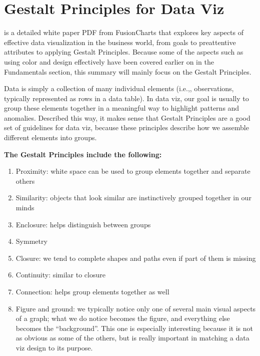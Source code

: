 \documentclass[]{book}
\providecommand{\tightlist}{%
  \setlength{\itemsep}{0pt}\setlength{\parskip}{0pt}}
\theoremstyle{definition}
\theoremstyle{definition}
\theoremstyle{definition}
\theoremstyle{remark}
\begin{document}
\section{Gestalt Principles for Data
Viz}\label{gestalt-principles-for-data-viz}

\citep{principles-fusioncharts} is a detailed white paper PDF from
FusionCharts that explores key aspects of effective data visualization
in the business world, from goals to preattentive attributes to applying
Gestalt Principles. Because some of the aspects such as using color and
design effectively have been covered earlier on in the Fundamentals
section, this summary will mainly focus on the Gestalt Principles.

Data is simply a collection of many individual elements (i.e.,,
observations, typically represented as rows in a data table). In data
viz, our goal is usually to group these elements together in a
meaningful way to highlight patterns and anomalies. Described this way,
it makes sense that Gestalt Principles are a good set of guidelines for
data viz, because these principles describe how we assemble different
elements into groups.

\textbf{The Gestalt Principles include the following:}

\begin{enumerate}
\def\labelenumi{\arabic{enumi}.}
\tightlist
\item
  Proximity: white space can be used to group elements together and
  separate others
\item
  Similarity: objects that look similar are instinctively grouped
  together in our minds
\item
  Enclosure: helps distinguish between groups
\item
  Symmetry
\item
  Closure: we tend to complete shapes and paths even if part of them is
  missing
\item
  Continuity: similar to closure
\item
  Connection: helps group elements together as well
\item
  Figure and ground: we typically notice only one of several main visual
  aspects of a graph; what we do notice becomes the figure, and
  everything else becomes the ``background''. This one is especially
  interesting because it is not as obvious as some of the others, but is
  really important in matching a data viz design to its purpose.
\end{enumerate}
\end{document}
